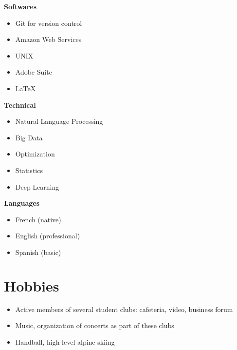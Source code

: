 \documentclass[a4paper,10.5pt]{article}
\begin{document}
\begin{paracol}{2}
\begin{rightcolumn}
			\textbf{Softwares}
			\begin{itemize}
				\item Git for version control
				\item Amazon Web Services
				\item UNIX
				\item Adobe Suite
				\item \LaTeX
			\end{itemize}
			\vspace{0.2cm}
			
			\textbf{Technical}
			\begin{itemize}
				\item Natural Language Processing
				\item Big Data
				\item Optimization
				\item Statistics
				\item Deep Learning
			\end{itemize}
			\vspace{0.2cm}
			
			\textbf{Languages}
			\begin{itemize}
				\item French (native)
				\item English (professional)
				\item Spanish (basic)
			\end{itemize}
		
		\section*{Hobbies}
		\begin{itemize}
			\item Active members of several student clubs: cafeteria, video, business forum
			\item Music, organization of concerts as part of these clubs
			\item Handball, high-level alpine skiing
		\end{itemize}
			
		\end{rightcolumn}
		
	\end{paracol}
	
	
	
	
\end{document}
